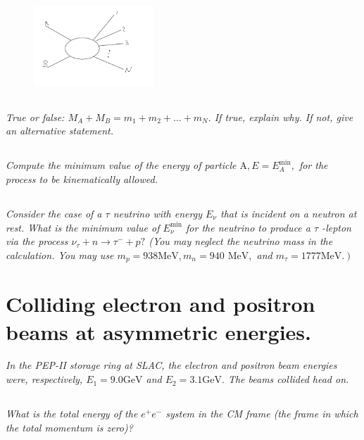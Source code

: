 \documentclass{article}
\begin{document}
\begin{figure}[h!]
    \centering
    \includegraphics[width=0.4\textwidth]{figures/problem_5.png}
    \label{fig:my_label}
\end{figure}
\subsection{}
\textit{True or false: $M_{A}+M_{B}=m_{1}+m_{2}+\ldots+m_{N} .$ If true, explain why. If not, give an alternative statement.}


\subsection{}
\textit{Compute the minimum value of the energy of particle $\mathrm{A}, E=E_{A}^{\min },$ for the process to be kinematically allowed.}

\subsection{}
\textit{Consider the case of a $\tau$ neutrino with energy $E_{\nu}$ that is incident on a neutron at rest. What is the minimum value of $E_{\nu}^{\min }$ for the neutrino to produce a $\tau$ -lepton via the process $\nu_{\tau}+n \rightarrow \tau^{-}+p ?$ (You may neglect the neutrino mass in the calculation. You may use $m_{p}=938 \mathrm{MeV}, m_{n}=940$ $\mathrm{MeV},$ and $\left.m_{\tau}=1777 \mathrm{MeV} .\right)$}

\newpage


\section{Colliding electron and positron beams at asymmetric energies.}
\textit{In the PEP-II storage ring at SLAC, the electron and positron beam energies were, respectively, $E_{1}=9.0 \mathrm{GeV}$ and $E_{2}=3.1 \mathrm{GeV} .$ The beams collided head on.}
\subsection{}
\textit{What is the total energy of the $e^{+} e^{-}$ system in the CM frame (the frame in which the total momentum is zero)?}
\end{document}
